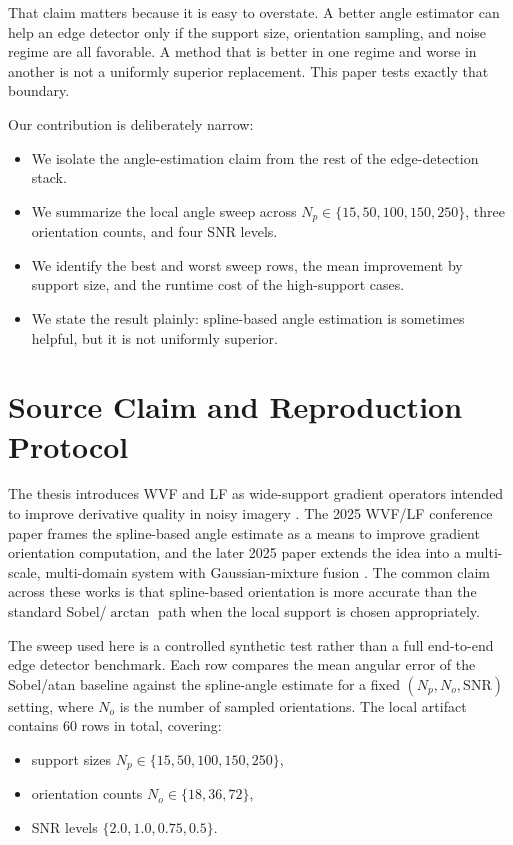 \documentclass[conference]{IEEEtran}
\begin{document}
That claim matters because it is easy to overstate. A better angle estimator can help an edge detector only if the support size, orientation sampling, and noise regime are all favorable. A method that is better in one regime and worse in another is not a uniformly superior replacement. This paper tests exactly that boundary.

Our contribution is deliberately narrow:
\begin{itemize}
    \item We isolate the angle-estimation claim from the rest of the edge-detection stack.
    \item We summarize the local angle sweep across \(N_p \in \{15,50,100,150,250\}\), three orientation counts, and four SNR levels.
    \item We identify the best and worst sweep rows, the mean improvement by support size, and the runtime cost of the high-support cases.
    \item We state the result plainly: spline-based angle estimation is sometimes helpful, but it is not uniformly superior.
\end{itemize}

\section{Source Claim and Reproduction Protocol}
The thesis introduces WVF and LF as wide-support gradient operators intended to improve derivative quality in noisy imagery \cite{bagan2023thesis}. The 2025 WVF/LF conference paper frames the spline-based angle estimate as a means to improve gradient orientation computation, and the later 2025 paper extends the idea into a multi-scale, multi-domain system with Gaussian-mixture fusion \cite{bagan2025wvf,bagan2025msmd}. The common claim across these works is that spline-based orientation is more accurate than the standard Sobel/\(\arctan\) path when the local support is chosen appropriately.

The sweep used here is a controlled synthetic test rather than a full end-to-end edge detector benchmark. Each row compares the mean angular error of the Sobel/atan baseline against the spline-angle estimate for a fixed \((N_p, N_o, \mathrm{SNR})\) setting, where \(N_o\) is the number of sampled orientations. The local artifact contains 60 rows in total, covering:
\begin{itemize}
    \item support sizes \(N_p \in \{15,50,100,150,250\}\),
    \item orientation counts \(N_o \in \{18,36,72\}\),
    \item SNR levels \(\{2.0,1.0,0.75,0.5\}\).
\end{itemize}
\end{document}
